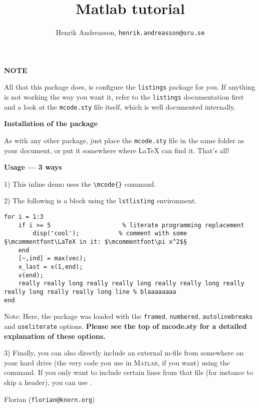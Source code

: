 \documentclass{article}
\title{Matlab tutorial}
\author{Henrik Andreasson, \texttt{henrik.andreasson@oru.se}}
\begin{document}
\maketitle

\textbf{NOTE}

All that this package does, is configure the \verb|listings| package for you. If anything is not working the way you want it, refer to the \verb|listings| documentation first and a look at the \verb|mcode.sty| file itself, which is well documented internally.

\textbf{Installation of the package}

As with any other package, just place the \verb|mcode.sty| file in the same folder as your document, or put it somewhere where \LaTeX{} can find it.  That's all!

\medskip

\textbf{Usage --- 3 ways}

1) This inline demo  uses the \verb|\mcode{}| command.

2) The following is a block using the \verb|lstlisting| environment.
\begin{lstlisting}
for i = 1:3
	if i >= 5                    % literate programming replacement
		disp('cool');           % comment with some §\mcommentfont\LaTeX in it: $\mcommentfont\pi x^2$§
	end
	[~,ind] = max(vec);
	x_last = x(1,end);
	v(end);
	really really long really really long really really long really really long really really long line % blaaaaaaaa
end
\end{lstlisting}
Note: Here, the package was loaded with the \verb|framed|, \verb|numbered|, \verb|autolinebreaks| and \verb|useliterate| options.  \textbf{Please see the top of mcode.sty for a detailed explanation of these options.}


3) Finally, you can also directly include an external m-file from somewhere on your hard drive (the very code you use in \textsc{Matlab}, if you want) using the \verb|| command.  If you only want to include certain lines from that file (for instance to skip a header), you can use \verb||.

\medskip


Florian (\texttt{florian@knorn.org})
\end{document}
